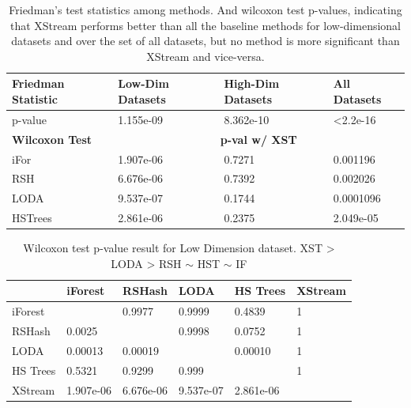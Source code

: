 \begin{table}[]
\centering
\begin{tabular}{l|lll}
\hline	\hline
\textbf{Friedman Statistic} & \textbf{Low-Dim Datasets} & \textbf{High-Dim Datasets} & \textbf{All Datasets}    \\ \hline
p-value            & 1.155e-09        & 8.362e-10         & \textless2.2e-16 \\ \hline \hline
\textbf{Wilcoxon Test}      & \multicolumn{3}{c}{\textbf{p-val w/ XST}}                        \\ 	\hline
iFor               & 1.907e-06         & 0.7271         &  0.001196       \\
RSH                & 6.676e-06         & 0.7392         & 0.002026        \\
LODA               & 9.537e-07         & 0.1744         & 0.0001096            \\
HSTrees            & 2.861e-06        & 0.2375          &  2.049e-05	\\	\hline
\end{tabular}
\caption{Friedman's test statistics among methods. And wilcoxon test p-values, indicating that XStream performs better than all the baseline methods for low-dimensional datasets and over the set of all datasets, but no method is more significant than XStream and vice-versa.}
\label{my-label}
\end{table}

\begin{table}
\centering
    \begin{tabular}{|l|lllll|}
    \hline
    ~        & iForest   & RSHash    & LODA      & HS Trees  & XStream \\	\hline
    iForest  & ~         & 0.9977    & 0.9999    & 0.4839    & 1       \\ 
    RSHash   & 0.0025    & ~         & 0.9998    & 0.0752    & 1       \\
    LODA     & 0.00013   & 0.00019   & ~         & 0.00010   & 1       \\
    HS Trees & 0.5321    & 0.9299    & 0.999     & ~         & 1       \\
    XStream  & 1.907e-06 & 6.676e-06 & 9.537e-07 & 2.861e-06 & ~       \\	\hline
    \end{tabular}
    \caption{Wilcoxon test p-value result for Low Dimension dataset. XST > LODA > RSH $\sim$ HST $\sim$ IF}
\end{table}

